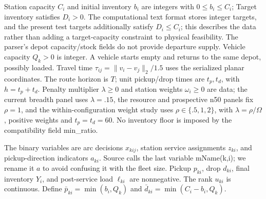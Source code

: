 \documentclass[
  american,
  11pt,
]{article}
\begin{document}
Station capacity \(C_i\) and initial inventory \(b_i\) are integers with
\(0\le b_i\le C_i\); Target inventory satisfies \(D_i>0\). The
computational text format stores integer targets, and the present test
targets additionally satisfy \(D_i\le C_i\); this describes the data
rather than adding a target-capacity constraint to physical feasibility.
The parser's depot capacity/stock fields do not provide departure
supply. Vehicle capacity \(Q_k>0\) is integer. A vehicle starts empty
and returns to the same depot, possibly loaded. Travel time
\(\tau_{ij}=\|v_i-v_j\|_2/1.5\) uses the serialized planar coordinates.
The route horizon is \(T\); unit pickup/drop times are \(t_p,t_d\), with
\(h=t_p+t_d\). Penalty multiplier \(\lambda\ge0\) and station weights
\(\omega_i\ge0\) are data; the current breadth panel uses
\(\lambda=.15\), the resource and prospective n50 panels fix \(\rho=1\),
and the within-configuration weight study uses \(\rho\in\{.5,1,2\}\),
with \(\lambda=\rho/\Omega\), positive weights and \(t_p=t_d=60\). No
inventory floor is imposed by the compatibility field min\_\allowbreak{}ratio.

The binary variables are arc decisions \(x_{kij}\), station service
assignments \(z_{ki}\), and pickup-direction indicators \(a_{ki}\).
Source calls the last variable mName(k,i); we rename it \(a\) to avoid
confusing it with the fleet size. Pickup \(p_{ki}\), drop \(d_{ki}\),
final inventory \(Y_i\), and post-service load \(\ell_{ki}\) are
nonnegative. The rank \(u_{ki}\) is continuous. Define
\(\bar p_{ki}=\min(b_i,Q_k)\) and \(\bar d_{ki}=\min(C_i-b_i,Q_k)\).
\end{document}
